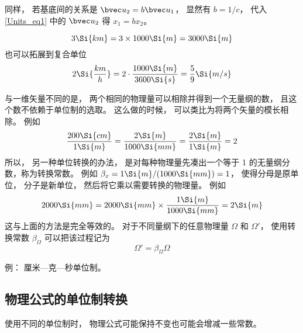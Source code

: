 同样， 若基底间的关系是 $\bvec u_2 = b\bvec u_1$， 显然有 $b = 1/c$， 代入\autoref{Units_eq1} 中的 $\bvec u_2$ 得 $x_1 = b x_2$。

\begin{example}{}
\begin{equation}
3 \Si{km} = 3\times 1000\Si{m} = 3000\Si{m}
\end{equation}
也可以拓展到复合单位
\begin{equation}
2 \Si{\frac{km}{h}} = 2\cdot \frac{1000 \Si{m}}{3600 \Si{s}} = \frac{5}{9}\Si{m/s}
\end{equation}
\end{example}

与一维矢量不同的是， 两个相同的物理量可以相除并得到一个无量纲的数， 且这个数不依赖于单位制的选取。 这么做的时候， 可以类比为将两个矢量的模长相除。 例如
\begin{equation}
\frac{200\Si{cm}}{1\Si{m}} = \frac{2\Si{m}}{1000\Si{mm}} = \frac{2\Si{m}}{1\Si{m}} = 2
\end{equation}
所以， 另一种单位转换的办法， 是对每种物理量先凑出一个等于 1 的无量纲分数，称为转换常数。 例如 $\beta_x = 1\Si{m}/(1000\Si{mm}) = 1$， 使得分母是原单位， 分子是新单位， 然后将它乘以需要转换的物理量。 例如
\begin{equation}
2000\Si{mm} = 2000\Si{mm} \times \frac{1\Si{m}}{1000\Si{mm}} = 2\Si{m}
\end{equation}
这与上面的方法是完全等效的。 对于不同量纲下的任意物理量 $\Omega$ 和 $\Omega'$， 使用转换常数 $\beta_\Omega$ 可以把该过程记为
\begin{equation}
\Omega' = \beta_\Omega \Omega
\end{equation}

例： 厘米—克—秒单位制。

\subsection{物理公式的单位制转换}
使用不同的单位制时， 物理公式可能保持不变也可能会增减一些常数。

